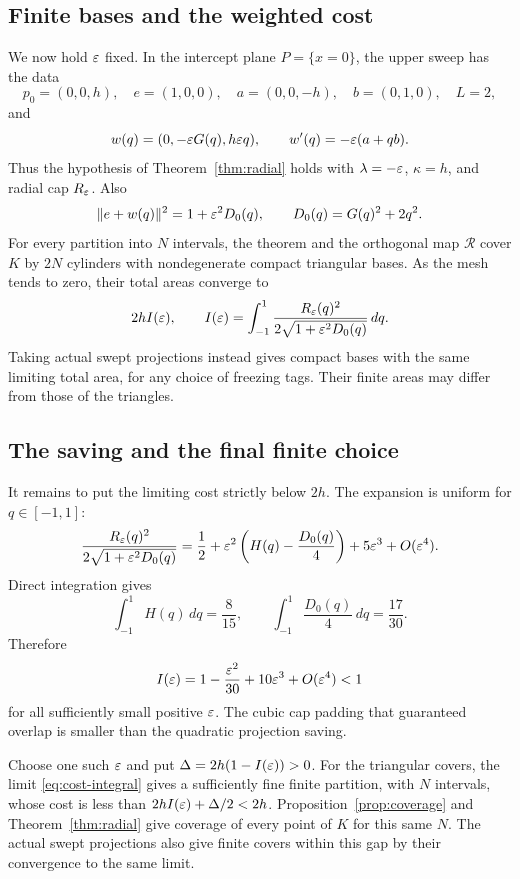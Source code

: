 \subsection{Finite bases and the weighted cost}

We now hold $\varepsilon$ fixed. In the intercept plane $P=\{x=0\}$,
the upper sweep has the data
\[
 p_0=(0,0,h),\quad e=(1,0,0),\quad
 a=(0,0,-h),\quad b=(0,1,0),\quad L=2,
\]
and
\[
 w(q)=(0,-\varepsilon G(q),h\varepsilon q),\qquad
 w'(q)=-\varepsilon(a+qb).
\]
Thus the hypothesis of Theorem~\ref{thm:radial} holds with
$\lambda=-\varepsilon$, $\kappa=h$, and radial cap $R_\varepsilon$.
Also
\[
 \lVert e+w(q)\rVert^2=1+\varepsilon^2D_0(q),\qquad
 D_0(q)=G(q)^2+2q^2.
\]
For every partition into $N$ intervals, the theorem and the orthogonal
map $\mathcal R$ cover $K$ by $2N$ cylinders with nondegenerate compact
triangular bases. As the mesh tends to zero, their total areas converge to
\begin{equation}\label{eq:cost-integral}
 2hI(\varepsilon),\qquad
 I(\varepsilon)=\int_{-1}^1
       \frac{R_\varepsilon(q)^2}{2\sqrt{1+\varepsilon^2D_0(q)}}\,dq.
\end{equation}
Taking actual swept projections instead gives compact bases with
the same limiting total area, for any choice of freezing tags.
Their finite areas may differ from those of the triangles.

\subsection{The saving and the final finite choice}

It remains to put the limiting cost strictly below $2h$.
The expansion is uniform for $q\in[-1,1]$:
\[
 \frac{R_\varepsilon(q)^2}{2\sqrt{1+\varepsilon^2D_0(q)}}
 =\frac12+\varepsilon^2\left(H(q)-\frac{D_0(q)}4\right)
       +5\varepsilon^3+O(\varepsilon^4).
\]
Direct integration gives
\[
 \int_{-1}^1H(q)\,dq=\frac8{15},\qquad
 \int_{-1}^1\frac{D_0(q)}4\,dq=\frac{17}{30}.
\]
Therefore
\begin{equation}\label{eq:strict-expansion}
 I(\varepsilon)=1-\frac{\varepsilon^2}{30}+10\varepsilon^3+O(\varepsilon^4)<1
\end{equation}
for all sufficiently small positive $\varepsilon$.
The cubic cap padding that guaranteed overlap is smaller than
the quadratic projection saving.

Choose one such $\varepsilon$ and put
$\Delta=2h(1-I(\varepsilon))>0$.
For the triangular covers, the limit \eqref{eq:cost-integral}
gives a sufficiently fine finite partition, with $N$ intervals, whose
cost is less than $2hI(\varepsilon)+\Delta/2<2h$.
Proposition~\ref{prop:coverage} and Theorem~\ref{thm:radial}
give coverage of every point of $K$ for this same $N$.
The actual swept projections also give finite covers within this gap
by their convergence to the same limit.

